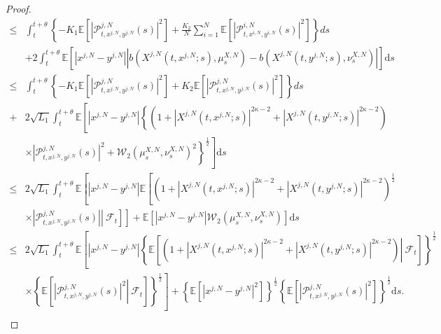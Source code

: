 \documentclass[10pt,a4paper]{amsart}
\begin{document}
\begin{proof}
\begin{equation}
\begin{aligned}
\le &\int_t^{t+\theta}{\left\{ -K_1\mathbb{E} \left[ \left|\mathcal{P} _{t,x^{j,N},y^{j,N}}^{j,N}\left( s \right) \right|^2 \right] +\tfrac{K_2}{N}\sum_{i=1}^N{\mathbb{E} \left[ \left|\mathcal{P} _{t,x^{i,N},y^{i,N}}^{i,N}\left(s\right)\right|^2 \right]} \right\}}ds\\
&+2\int_t^{t+\theta}{\mathbb{E}\left[ \left|x^{j,N}-y^{j,N}\right|\left|b\left(X^{j,N}\left(t,x^{j,N};s\right),\mu _{s}^{X,N}\right)-b\left(X^{j,N}\left(t,y^{j,N};s\right),\nu _{s}^{X,N}\right)\right| \right]} \mathrm{d}s\\
\le &\int_t^{t+\theta}{\left\{ -K_1\mathbb{E} \left[ \left|\mathcal{P} _{t,x^{j,N},y^{j,N}}^{j,N}\left( s \right) \right|^2 \right] +K_2\mathbb{E} \left[ \left|\mathcal{P} _{t,x^{j,N},y^{j,N}}^{j,N}\left(s\right)\right|^2 \right] \right\}}ds\\
+&2\sqrt{L_1}\int_t^{t+\theta}\mathbb{E}\left[\left|x^{j,N}-y^{j,N}\right|\left\{ \left(1+\left|X^{j,N}\left(t,x^{j,N};s\right)\right|^{2\kappa -2}+\left|X^{j,N}\left(t,y^{j,N};s\right)\right|^{2\kappa -2}\right) \right.\right.\\
&\times\left. \left.\left| \mathcal{P} _{t,x^{j,N},y^{j,N}}^{j,N}\left( s \right) \right|^2+\mathcal{W} _2\left( \mu _{s}^{X,N},\nu _{s}^{X,N} \right) ^2 \right\} ^{\frac{1}{2}}\right]\mathrm{d}s\\
\le &2\sqrt{L_1}\int_t^{t+\theta}\mathbb{E}\left[\left|x^{j,N}-y^{j,N}\right|\mathbb{E} \left[ \left(1+\left|X^{j,N}\left(t,x^{j,N};s\right)\right|^{2\kappa -2}+\left|X^{j,N}\left(t,y^{j,N};s\right)\right|^{2\kappa -2}\right)^{\frac{1}{2}}\right. \right.\\
&\times\left. \left. \left. \left| \mathcal{P} _{t,x^{j,N},y^{j,N}}^{j,N}\left( s \right) \right|\right\rvert\ \mathcal{F} _t  \right] \right] +\mathbb{E} \left[ \left|x^{j,N}-y^{j,N}\right|\mathcal{W} _2\left( \mu _{s}^{X,N},\nu _{s}^{X,N} \right) \right] \mathrm{d}s\\
\le&2\sqrt{L_1}\int_t^{t+\theta}\mathbb{E}\left[\left|x^{j,N}-y^{j,N}\right|\left\{ \mathbb{E} \left[\left.\left(1+\left|X^{j,N}\left(t,x^{j,N};s\right)\right|^{2\kappa -2}+\left|X^{j,N}\left(t,y^{j,N};s\right)\right|^{2\kappa -2}\right)\right\rvert\ \mathcal{F} _t \right] \right\} ^{\frac{1}{2}}\right.\\
&\times\left.  \left\{ \mathbb{E} \left[\left. \left| \mathcal{P} _{t,x^{j,N},y^{j,N}}^{j,N}\left( s \right) \right|^2 \right\rvert\ \mathcal{F} _t  \right] \right\} ^{\frac{1}{2}} \right] +\left\{ \mathbb{E} \left[ \left|x^{j,N}-y^{j,N}\right|^2 \right] \right\} ^{\frac{1}{2}}\left\{ \mathbb{E} \left[ \left| \mathcal{P} _{t,x^{j,N},y^{j,N}}^{j,N}\left( s \right) \right|^2 \right] \right\} ^{\frac{1}{2}}\mathrm{d}s.\\

\end{aligned}
\end{equation}
\end{proof}
\end{document}
